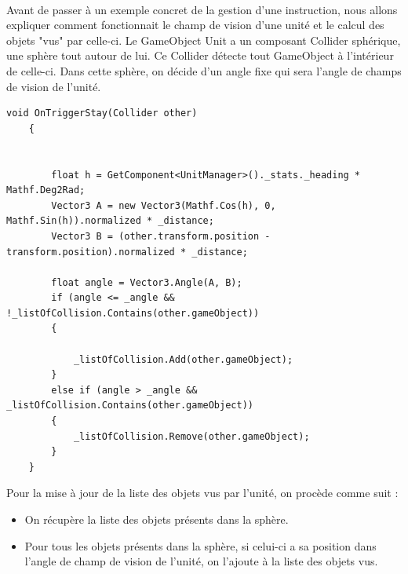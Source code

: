 \documentclass{report}
\begin{document}
\paragraph{}Avant de passer à un exemple concret de la gestion d'une instruction, nous allons expliquer comment fonctionnait le champ de vision d'une unité et le calcul des objets "vus" par celle-ci.
Le GameObject Unit a un composant Collider sphérique, une sphère tout autour de lui. Ce Collider détecte tout GameObject à l'intérieur de celle-ci. Dans cette sphère, on décide d'un angle fixe qui sera l'angle de champs de vision de l'unité.
\begin{lstlisting}[language={[Sharp]C},label={lst:unitScript}, caption=  Extrait du code du script Sight.cs première version.]
    void OnTriggerStay(Collider other)
    {
      

        float h = GetComponent<UnitManager>()._stats._heading * Mathf.Deg2Rad;
        Vector3 A = new Vector3(Mathf.Cos(h), 0, Mathf.Sin(h)).normalized * _distance;
        Vector3 B = (other.transform.position - transform.position).normalized * _distance;

        float angle = Vector3.Angle(A, B);
        if (angle <= _angle && !_listOfCollision.Contains(other.gameObject))
        {
            
            _listOfCollision.Add(other.gameObject);
        }
        else if (angle > _angle && _listOfCollision.Contains(other.gameObject))
        {
            _listOfCollision.Remove(other.gameObject);
        }
    }
\end{lstlisting}
Pour la mise à jour de la liste des objets vus par l'unité, on procède comme suit :
\begin{itemize}
\item On récupère la liste des objets présents dans la sphère.
\item Pour tous les objets présents dans la sphère, si celui-ci a sa position dans l'angle de champ de vision de l'unité, on l'ajoute à la liste des objets vus.
\end{itemize}
\end{document}
